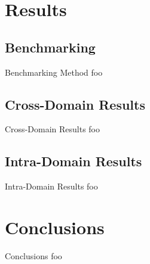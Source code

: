 \documentclass{beamer}
\begin{document}
\section{Results}
\subsection{Benchmarking}
\begin{frame}{Benchmarking Method}
    foo
\end{frame}

\subsection{Cross-Domain Results}
\begin{frame}{Cross-Domain Results}
    foo
\end{frame}

\subsection{Intra-Domain Results}
\begin{frame}{Intra-Domain Results}
    foo
\end{frame}

\section{Conclusions}
\begin{frame}{Conclusions}
    foo
\end{frame}

\end{document}
